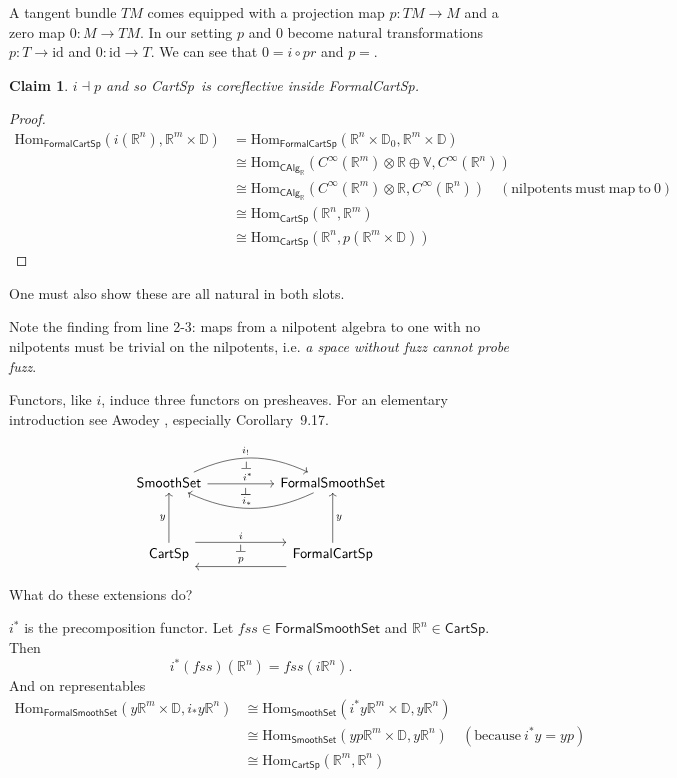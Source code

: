 \documentclass[12pt]{article}
\newcommand{\Hom}{\mathrm{Hom}}
\newcommand{\adj}{\dashv}
\newcommand{\id}{\ensuremath{\text{id}}}
\newcommand{\rr}{\ensuremath{\mathbb{R}}}
\newcommand{\rrn}{\ensuremath{\mathbb{R}^n}}
\newcommand{\rrm}{\ensuremath{\mathbb{R}^m}}
\newcommand{\dd}{\ensuremath{\mathbb{D}}}
\newcommand{\vv}{\ensuremath{\mathbb{V}}}
\newcommand{\cinfty}{\ensuremath{C^{\infty}}}
\newcommand{\calg}{\textsf{CAlg}_{\rr}}
\newcommand{\cart}{\textsf{CartSp}}
\newcommand{\formalcart}{\textsf{FormalCartSp}}
\newcommand{\formalsmoothset}{\textsf{FormalSmoothSet}}
\newcommand{\smoothset}{\textsf{SmoothSet}}
\newtheorem{myclaim}{Claim}
\begin{document}
A tangent bundle $TM$ comes equipped with a projection map $p:TM\to M$ and a zero map $0:M\to TM$. In our setting $p$ and $0$ become natural transformations $p:T\to\id$ and $0:\id\to T$. We can see that $0=i\circ pr$ and $p=$.

\begin{myclaim}$i\adj p$ and so \cart\ is coreflective inside \formalcart.\end{myclaim}

\begin{proof}
\begin{align*}
\Hom_{\formalcart}(i(\rrn), \rrm\times\dd) &= \Hom_{\formalcart}(\rrn\times\dd_0, \rrm\times\dd) \\
&\cong \Hom_{\calg}(\cinfty(\rrm)\otimes\rr\oplus\vv, \cinfty(\rrn)) \\
&\cong \Hom_{\calg}(\cinfty(\rrm)\otimes\rr, \cinfty(\rrn))\quad\mathrm{(nilpotents\ must\ map\ to\ 0)} \\
&\cong \Hom_{\cart}(\rrn, \rrm) \\
&\cong \Hom_{\cart}(\rrn, p(\rrm\times\dd))
\end{align*}
\end{proof}
One must also show these are all natural in both slots.

Note the finding from line 2-3: maps from a nilpotent algebra to one with no nilpotents must be trivial on the nilpotents, i.e. \emph{a space without fuzz cannot probe fuzz}.

Functors, like $i$, induce three functors on presheaves. For an elementary introduction see Awodey \cite{awodey_introduction_2010}, especially Corollary~9.17.

$$
\begin{tikzcd}[row sep=huge, column sep=huge]
\smoothset \arrow[r, "\mkern-16mu i_!"{name=F}, bend left=25]
\arrow[r, "\quad i^*"{name=G}]
\arrow[phantom, from=F, to=G, "\ \dashv" rotate=-90]
& \formalsmoothset \arrow[l, "\mkern-12mu i_*"{name=H}, swap, bend left=25]
\arrow[phantom, from=G, to=H, "\ \dashv" rotate=-90] \\
\cart \arrow[u, "y"] \arrow[r, "i"{name=I}, shift left=2.0ex] 
& \formalcart \arrow[l, "p"{name=P}, shift left=2.0ex, swap] 
\arrow[u, "y", swap]
\arrow[phantom, from=I, to=P, "\dashv" rotate=-90]
\end{tikzcd}
$$

What do these extensions do?

$i^*$ is the precomposition functor. Let $fss\in\formalsmoothset$ and $\rrn\in\cart$. Then $$i^*(fss)(\rrn)=fss(i\rrn).$$ And on representables
\begin{align*}
\Hom_{\formalsmoothset}(y\rrm\times\dd, i_*y\rrn) &\cong \Hom_{\smoothset}(i^*y\rrm\times\dd, y\rrn) \\
&\cong \Hom_{\smoothset} (yp\rrm\times\dd, y\rrn)\quad(\mathrm{because\ }i^*y=yp)\\
&\cong \Hom_{\cart} (\rrm, \rrn)
\end{align*}
\end{document}
